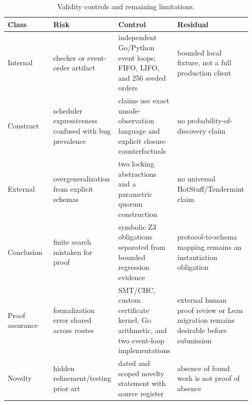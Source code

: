 \begin{table}[t]
\centering
\small
\begin{tabular}{p{0.235\linewidth}p{0.235\linewidth}p{0.235\linewidth}p{0.235\linewidth}}
\toprule
Class & Risk & Control & Residual \\
\midrule
Internal & checker or event-order artifact & independent Go/Python event loops; FIFO, LIFO, and 256 seeded orders & bounded local fixture, not a full production client \\
Construct & scheduler expressiveness confused with bug prevalence & claims use exact unsafe-observation language and explicit closure counterfactuals & no probability-of-discovery claim \\
External & overgeneralization from explicit schemas & two locking abstractions and a parametric quorum construction & no universal HotStuff/Tendermint claim \\
Conclusion & finite search mistaken for proof & symbolic Z3 obligations separated from bounded regression evidence & protocol-to-schema mapping remains an instantiation obligation \\
Proof assurance & formalization error shared across routes & SMT/CHC, custom certificate kernel, Go arithmetic, and two event-loop implementations & external human proof review or Lean migration remains desirable before submission \\
Novelty & hidden refinement/testing prior art & dated and scoped novelty statement with source register & absence of found work is not proof of absence \\
\bottomrule
\end{tabular}
\caption{Validity controls and remaining limitations.}
\label{tab:table6_validity}
\end{table}
